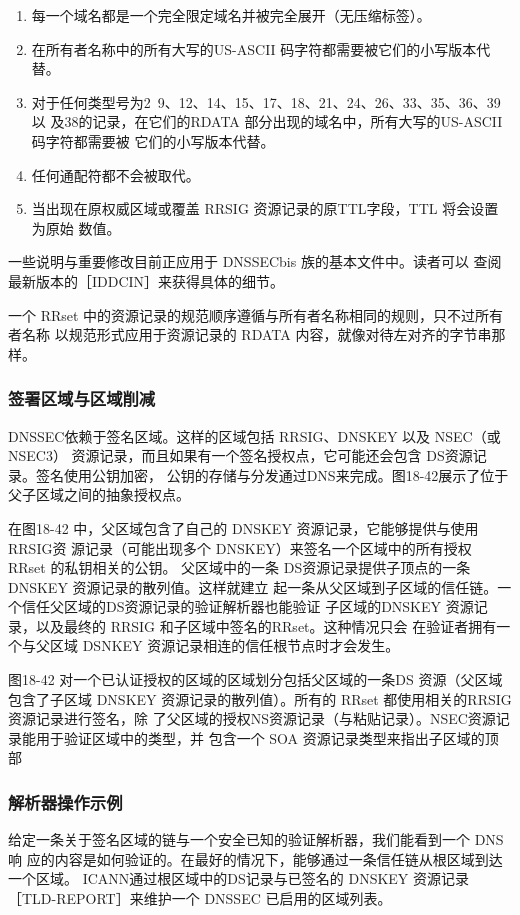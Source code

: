 \begin{enumerate}
    \item 每一个域名都是一个完全限定域名并被完全展开（无压缩标签）。
    \item 在所有者名称中的所有大写的US-ASCII 码字符都需要被它们的小写版本代替。
    \item 对于任何类型号为2~9、12、14、15、17、18、21、24、26、33、35、36、39以
    及38的记录，在它们的RDATA 部分出现的域名中，所有大写的US-ASCII 码字符都需要被
    它们的小写版本代替。
    \item 任何通配符都不会被取代。
    \item 当出现在原权威区域或覆盖 RRSIG 资源记录的原TTL字段，TTL 将会设置为原始
    数值。
\end{enumerate}

\begin{tcolorbox}
    一些说明与重要修改目前正应用于 DNSSECbis 族的基本文件中。读者可以
    查阅最新版本的［IDDCIN］来获得具体的细节。
\end{tcolorbox}

一个 RRset 中的资源记录的规范顺序遵循与所有者名称相同的规则，只不过所有者名称
以规范形式应用于资源记录的 RDATA 内容，就像对待左对齐的字节串那样。

\subsubsection{签署区域与区域削减}
DNSSEC依赖于签名区域。这样的区域包括 RRSIG、DNSKEY 以及 NSEC（或NSEC3）
资源记录，而且如果有一个签名授权点，它可能还会包含 DS资源记录。签名使用公钥加密，
公钥的存储与分发通过DNS来完成。图18-42展示了位于父子区域之间的抽象授权点。

在图18-42 中，父区域包含了自己的 DNSKEY 资源记录，它能够提供与使用 RRSIG资
源记录（可能出现多个 DNSKEY）来签名一个区域中的所有授权 RRset 的私钥相关的公钥。
父区域中的一条 DS资源记录提供子顶点的一条 DNSKEY 资源记录的散列值。这样就建立
起一条从父区域到子区域的信任链。一个信任父区域的DS资源记录的验证解析器也能验证
子区域的DNSKEY 资源记录，以及最终的 RRSIG 和子区域中签名的RRset。这种情况只会
在验证者拥有一个与父区域 DSNKEY 资源记录相连的信任根节点时才会发生。

图18-42 对一个已认证授权的区域的区域划分包括父区域的一条DS 资源（父区域包含了子区域
DNSKEY 资源记录的散列值）。所有的 RRset 都使用相关的RRSIG 资源记录进行签名，除
了父区域的授权NS资源记录（与粘贴记录）。NSEC资源记录能用于验证区域中的类型，并
包含一个 SOA 资源记录类型来指出子区域的顶部
\subsubsection{解析器操作示例}
给定一条关于签名区域的链与一个安全已知的验证解析器，我们能看到一个 DNS响
应的内容是如何验证的。在最好的情况下，能够通过一条信任链从根区域到达一个区域。
ICANN通过根区域中的DS记录与已签名的 DNSKEY 资源记录［TLD-REPORT］来维护一个
DNSSEC 已启用的区域列表。

